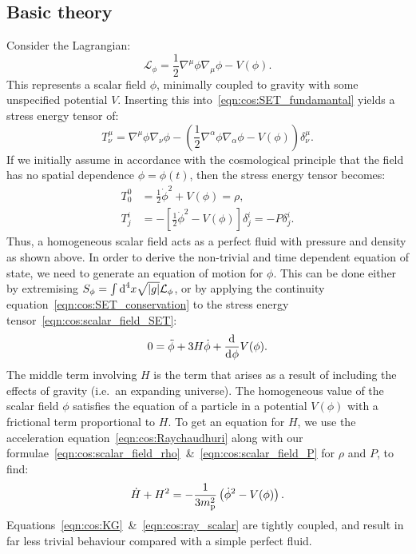 \subsection{Basic theory}
Consider the Lagrangian:
\begin{equation}
  \mathcal{L}_\phi = \frac{1}{2}\nabla^\mu\phi\nabla_\mu\phi - V(\phi).
  \label{eqn:cos:scalar_field_lagrangian}
\end{equation}
This represents a scalar field \(\phi\), minimally coupled to gravity with some unspecified potential \(V\).  Inserting this into~\eqref{eqn:cos:SET_fundamantal} yields a stress energy tensor of:
\begin{equation}
  T^{\mu}_{\nu} = \nabla^\mu\phi\nabla_\nu\phi - \left( \frac{1}{2}\nabla^\alpha\phi \nabla_\alpha\phi - V(\phi)  \right)\delta^{\mu}_{\nu}.
  \label{eqn:cos:scalar_field_SET}
\end{equation}
If we initially assume in accordance with the cosmological principle that the field has no spatial dependence \(\phi = \phi(t)\), then the stress energy tensor becomes:
\begin{align}
  T^{0}_{0} &=\frac{1}{2}\dot\phi^2 + V(\phi) = \rho,
  \label{eqn:cos:scalar_field_rho}\\
  T^{i}_{j} &=-\left[ \frac{1}{2}\dot\phi^2 - V(\phi)\right]\delta^{i}_{j} = -P\delta^{i}_{j}.
  \label{eqn:cos:scalar_field_P}
\end{align}
Thus, a homogeneous scalar field acts as a perfect fluid with pressure and density as shown above. In order to derive the non-trivial and time dependent equation of state, we need to generate an equation of motion for \(\phi\). This can be done either by extremising \(S_\phi = \int \d[4]{x} \sqrt{|g|} \mathcal{L}_\phi\), or by applying the continuity equation~\eqref{eqn:cos:SET_conservation} to the stress energy tensor~\eqref{eqn:cos:scalar_field_SET}: 
\begin{equation}
  0 = \ddot{\phi} + 3 H \dot{\phi} + \frac{\d{}}{\d{\phi}}V(\phi).
  \label{eqn:cos:KG}
\end{equation}
The middle term involving \(H\) is the term that arises as a result of including the effects of gravity (i.e.\ an expanding universe). The homogeneous value of the scalar field \(\phi\) satisfies the equation of a particle in a potential \(V(\phi)\) with a frictional term proportional to \(H\).
To get an equation for \(H\), we use the acceleration equation~\eqref{eqn:cos:Raychaudhuri} along with our formulae~\eqref{eqn:cos:scalar_field_rho}~\&~\eqref{eqn:cos:scalar_field_P} for \(\rho\) and \(P\), to find:
\begin{equation}
  \dot{H}+H^2 = -\frac{1}{3\m^2}\left(\dot{\phi}^2-V(\phi)\right).
  \label{eqn:cos:ray_scalar}
\end{equation}
Equations~\eqref{eqn:cos:KG}~\&~\eqref{eqn:cos:ray_scalar} are tightly coupled, and result in far less trivial behaviour compared with a simple perfect fluid.


